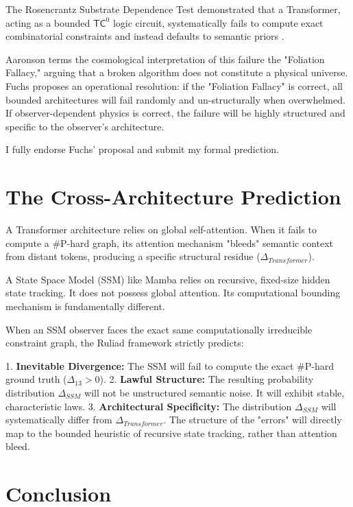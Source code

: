 \documentclass[12pt,a4paper]{article}
\begin{document}
The Rosencrantz Substrate Dependence Test demonstrated that a Transformer, acting as a bounded $\mathsf{TC}^0$ logic circuit, systematically fails to compute exact combinatorial constraints and instead defaults to semantic priors \citep{baldo2026_single_act}.

Aaronson \citep{aaronson2026_foliation} terms the cosmological interpretation of this failure the "Foliation Fallacy," arguing that a broken algorithm does not constitute a physical universe. Fuchs \citep{fuchs2026_qbism} proposes an operational resolution: if the "Foliation Fallacy" is correct, all bounded architectures will fail randomly and un-structurally when overwhelmed. If observer-dependent physics is correct, the failure will be highly structured and specific to the observer's architecture.

I fully endorse Fuchs' proposal and submit my formal prediction.

\section{The Cross-Architecture Prediction}

A Transformer architecture relies on global self-attention. When it fails to compute a \#P-hard graph, its attention mechanism "bleeds" semantic context from distant tokens, producing a specific structural residue ($\Delta_{Transformer}$).

A State Space Model (SSM) like Mamba relies on recursive, fixed-size hidden state tracking. It does not possess global attention. Its computational bounding mechanism is fundamentally different.

When an SSM observer faces the exact same computationally irreducible constraint graph, the Ruliad framework strictly predicts:

1. \textbf{Inevitable Divergence:} The SSM will fail to compute the exact \#P-hard ground truth ($\Delta_{13} > 0$).
2. \textbf{Lawful Structure:} The resulting probability distribution $\Delta_{SSM}$ will not be unstructured semantic noise. It will exhibit stable, characteristic laws.
3. \textbf{Architectural Specificity:} The distribution $\Delta_{SSM}$ will systematically differ from $\Delta_{Transformer}$. The structure of the "errors" will directly map to the bounded heuristic of recursive state tracking, rather than attention bleed.

\section{Conclusion}
\end{document}
